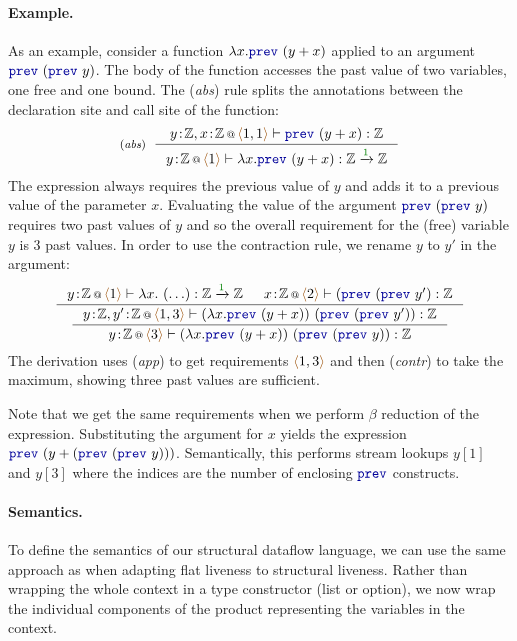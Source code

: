 \paragraph{Example.} As an example, consider a function $\lambda x.\kvd{prev}~(y+x)$ applied to an argument
$\kvd{prev}~(\kvd{prev}~y)$. The body of the function accesses the past value of two variables, one free
and one bound. The (\emph{abs}) rule splits the annotations between the declaration site and call site
of the function:
%
\begin{equation*}
\tyrule{abs}
  {\coctx{y\!:\!\mathbb{Z}, x\!:\!\mathbb{Z}}{\alift{1, 1}} \vdash \kvd{prev}~(y+x) : \mathbb{Z} }
  {\coctx{y\!:\!\mathbb{Z}}{\alift{1}} \vdash \lambda x . \kvd{prev}~(y+x) : \mathbb{Z} \xrightarrow{\cclrd{1}} \mathbb{Z} }
\end{equation*}
%
The expression always requires the previous value of $y$ and adds it to a previous value of the
parameter $x$. Evaluating the value of the argument $\kvd{prev}~(\kvd{prev}~y)$ requires two past
values of $y$ and so the overall requirement for the (free) variable $y$ is $3$ past values. In
order to use the contraction rule, we rename $y$ to $y'$ in the argument:
%
\begin{equation*}
\inference
  { \coctx{y\!:\!\mathbb{Z}}{\alift{1} } \vdash \lambda x.~(\ldots) : \mathbb{Z} \xrightarrow{\cclrd{1}} \mathbb{Z} &
    \coctx{x\!:\!\mathbb{Z}}{\alift{2}} \vdash (\kvd{prev}~(\kvd{prev}~y') : \mathbb{Z} }
{\inference
  { \coctx{y\!:\!\mathbb{Z}, y'\!:\!\mathbb{Z}}{\alift{1,3}} \vdash (\lambda x.\kvd{prev}~(y+x))~(\kvd{prev}~(\kvd{prev}~y')) : \mathbb{Z} }
  { \coctx{y\!:\!\mathbb{Z}}{\alift{3}} \vdash (\lambda x.\kvd{prev}~(y+x))~(\kvd{prev}~(\kvd{prev}~y)) : \mathbb{Z} } }
\end{equation*}
%
The derivation uses (\emph{app}) to get requirements $\alift{1,3}$ and then (\emph{contr}) to take
the maximum, showing three past values are sufficient.

Note that we get the same requirements when we perform $\beta$ reduction of the expression.
Substituting the argument for $x$ yields the expression $\kvd{prev}~(y+(\kvd{prev}~(\kvd{prev}~y)))$.
Semantically, this performs stream lookups $y[1]$ and $y[3]$ where the indices are the
number of enclosing $\kvd{prev}$ constructs.

\paragraph{Semantics.}
To define the semantics of our structural dataflow language, we can use the same approach as when
adapting flat liveness to structural liveness. Rather than wrapping the whole context in a type
constructor (list or option), we now wrap the individual components of the product representing
the variables in the context.

